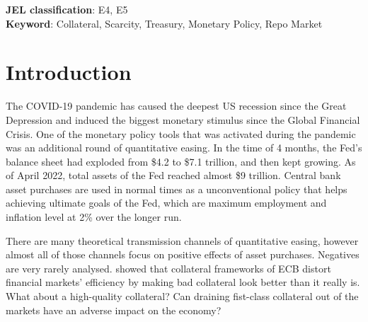 \documentclass[11pt,a4paper,english,oneside]{article}
\begin{document}

\begin{flushleft}
  \textbf{JEL classification}: E4, E5\\
  \textbf{Keyword}: Collateral, Scarcity, Treasury, Monetary Policy, Repo Market
\end{flushleft}

\section{Introduction} \label{sec:introduction} %

The COVID-19 pandemic has caused the deepest US recession since the Great Depression and induced the biggest monetary stimulus since the Global Financial Crisis. One of the monetary policy tools that was activated during the pandemic was an additional round of quantitative easing. In the time of 4 months, the Fed's balance sheet had exploded from \$4.2 to \$7.1 trillion, and then kept growing. As of April 2022, total assets of the Fed reached almost \$9 trillion. Central bank asset purchases are used in normal times as a unconventional policy that helps achieving ultimate goals of the Fed, which are maximum employment and inflation level at 2\% over the longer run.


There are many theoretical transmission channels of quantitative easing, however almost all of those channels focus on positive effects of asset purchases. Negatives are very rarely analysed. \citet{nyborg2015} showed that collateral frameworks of ECB distort financial markets' efficiency by making bad collateral look better than it really is. What about a high-quality collateral? Can draining fist-class collateral out of the markets have an adverse impact on the economy?
\end{document}
